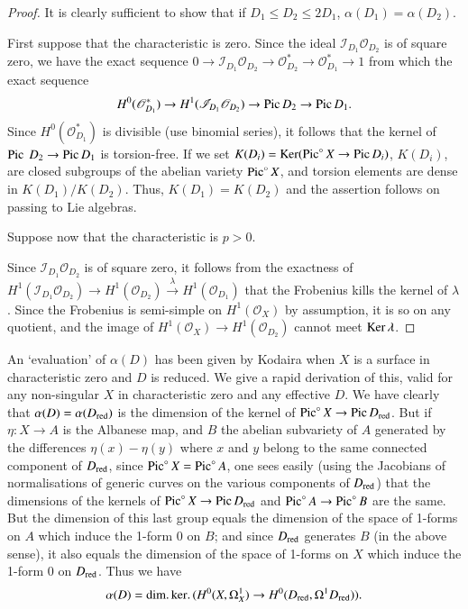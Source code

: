 \begin{proof}
It is clearly sufficient to show that if $D_1 \leqslant D_2 \leqslant 2 D_1$, $\alpha (D_1) = \alpha (D_2)$.

First suppose that the characteristic is zero. Since the ideal $\mathscr{I}_{D_1} \mathscr{O}_{D_2}$ is of square zero, we have the exact sequence $0 \to \mathscr{I}_{D_1} \mathscr{O}_{D_2} \to \mathscr{O}^*_{D_2 } \to \mathscr{O}^*_{D_1} \to 1$ from which the exact sequence
$$
H^0 (\mathscr{O}^*_{D_1}) \to H^1 (\mathscr{I}_{D_1} \mathscr{O}_{D_2}) \to \operatorname{Pic} D_2 \to \operatorname{Pic} D_1.
$$\pageoriginale
Since $H^0 (\mathscr{O}^*_{D_1})$ is divisible (use binomial series), it follows that the kernel of $\operatorname{Pic} ~D_2 \to \operatorname{Pic} D_1$ is torsion-free. If we set $K(D_i) = \operatorname{Ker} (\operatorname{Pic}^\circ X \to \operatorname{Pic} D_i)$, $K(D_i)$, are closed subgroups of the abelian variety $\operatorname{Pic}^\circ X$, and torsion elements are dense in $K(D_1)/ K(D_2)$. Thus, $K(D_1) = K(D_2)$ and the assertion follows on passing to Lie algebras.

Suppose now that the characteristic is $p>0$.

Since $\mathscr{I}_{D_1} \mathscr{O}_{D_2}$ is of square zero, it follows from the exactness of $H^1 (\mathscr{I}_{D_1} \mathscr{O}_{D_2}) \to H^1 (\mathscr{O}_{D_2}) \xrightarrow{~\lambda~}  H^1 (\mathscr{O}_{D_1})$ that the Frobenius kills the kernel of $\lambda$. Since the Frobenius is semi-simple on $H^1 (\mathscr{O}_X)$ by assumption, it is so on any quotient, and the image of $H^1(\mathscr{O}_X) \to H^1 (\mathscr{O}_{D_2})$ cannot meet $\operatorname{Ker} \lambda$.
\end{proof}

\begin{remark*}
An `evaluation' of $\alpha(D)$ has been given by Kodaira when $X$ is a surface in characteristic zero and $D$ is reduced. We give a rapid derivation of this, valid for any non-singular $X$ in characteristic zero and any effective $D$. We have clearly that $\alpha (D) = \alpha (D_{\operatorname{red}})$ is the dimension of the kernel of $\operatorname{Pic}^\circ X \to \operatorname{Pic}  D_{\operatorname{red}}$. But if $\eta: X \to A$ is the Albanese map, and $B$ the abelian subvariety of $A$ generated by the 
differences $\eta(x) - \eta(y)$ where $x$ and $y$ belong to the same connected component of $D_{\operatorname{red}}$, since $\operatorname{Pic}^\circ X = \operatorname{Pic}^\circ A$, one sees easily (using the Jacobians of normalisations of generic curves on the various components of $D_{\operatorname{red}}$) that the dimensions of the kernels of $\operatorname{Pic}^\circ X \to \operatorname{Pic} D_{\operatorname{red}}$  and $\operatorname{Pic}^\circ A \to \operatorname{Pic}^\circ B$ are the same. But the dimension of this last group equals the dimension of the space of 1-forms on $A$ which induce the 1-form 0 on $B$; and since $D_{\operatorname{red}}$ generates $B$ (in the above sense), it also equals the dimension of the space of 1-forms on $X$ which induce the 1-form 0 on $D_{\operatorname{red}}$. Thus we have 
$$
\alpha (D) = \dim \ldotp \ker \ldotp (H^0(X, \Omega^1_X) \to H^0 (D_{\operatorname{red}}, \Omega^{1} D_{\operatorname{red}})).
$$
\end{remark*}

